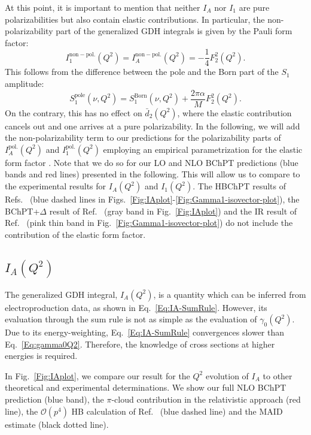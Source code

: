 \documentclass[twocolumn,prc,showpacs,nofootinbib,preprintnumbers,amsmath,amssymb,superscriptaddress]{revtex4-1}
\def\beq{\begin{equation}}
\def\eeq{\end{equation}}
\def\eqlab#1{\label{eq:#1}}
\def\al{\alpha}
\begin{document}
At this point, it is important to mention that neither $I_A$ nor $I_1$ are pure polarizabilities but also contain elastic contributions. In particular, the non-polarizability part of the generalized GDH integrals is given by the Pauli form factor:
\beq
I_1^\mathrm{non-pol.}(Q^2)=I_A^\mathrm{non-pol.}(Q^2)=-\frac{1}{4}F_2^2(Q^2).\eqlab{genGDHnonpole}
\eeq
This follows from the difference between the pole and the Born part of the $S_1$ amplitude:
\beq
S_1^{\mathrm{pole}}(\nu, Q^2)= S_1^{\mathrm{Born}}(\nu, Q^2) + \frac{2\pi \al}{M}F_2^2(Q^2).\eqlab{S1poleBorn}
\eeq
On the contrary, this has no effect on $\bar{d}_2(Q^2)$, where the elastic contribution cancels out and one arrives at a pure polarizability.
In the following, we will add the non-polarizability term to our predictions for the polarizability parts of $I_A^\mathrm{pol.}(Q^2)$ and $I_1^\mathrm{pol.}(Q^2)$ employing an empirical parametrization for the elastic form factor \cite{Bradford:2006yz}. Note that we do so for our LO and NLO BChPT predictions (blue bands and red lines) presented in the following. This will allow us to compare to the experimental results for $I_A(Q^2)$ and $I_1(Q^2)$. The HBChPT results of Refs.~\cite{Kao:2002cp,Kao:2003jd} (blue dashed lines in Figs.~\ref{Fig:IAplot}-\ref{Fig:Gamma1-isovector-plot}), the BChPT+$\Delta$ result of Ref.~\cite{Bernard:2012hb} (gray band in Fig.~\ref{Fig:IAplot}) and the IR result of Ref.~\cite{Bernard:2002pw,Bernard:2002bs} (pink thin band in Fig.~\ref{Fig:Gamma1-isovector-plot}) do not include the contribution of the elastic form factor.



\subsection{$I_A(Q^2)$}

The generalized GDH integral, $I_A(Q^2)$, is a quantity which can be inferred from electroproduction data, as shown in Eq.~\eqref{Eq:IA-SumRule}. 
However, its evaluation through the sum rule is not as simple as the evaluation of $\gamma_0(Q^2)$. Due to its energy-weighting, Eq.~\eqref{Eq:IA-SumRule} convergences slower than Eq.~\eqref{Eq:gamma0Q2}. Therefore, the knowledge of cross sections at higher energies is required.


In Fig.~\ref{Fig:IAplot}, we compare our result for the $Q^2$ evolution of $I_A$ to other theoretical and experimental determinations. We show our full NLO BChPT prediction (blue band), the $\pi$-cloud contribution in the relativistic approach (red line), the $\mathcal{O}(p^4)$ HB calculation of Ref.~\cite{Kao:2003jd} (blue dashed line) and the MAID estimate \cite{MAID} (black dotted line). 
\end{document}
